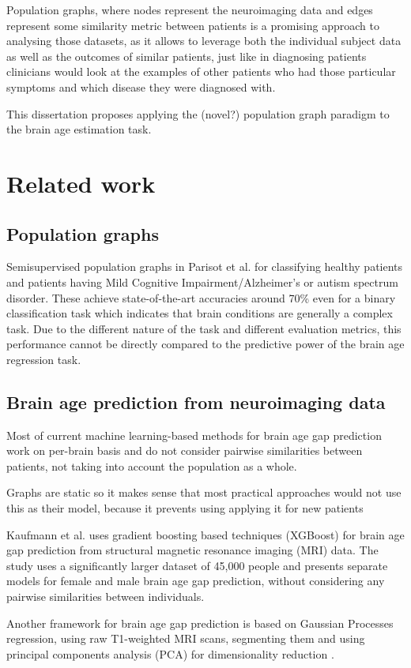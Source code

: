Population graphs, where nodes represent the neuroimaging data and edges represent some similarity metric between patients is a promising approach to analysing those datasets, as it allows to leverage both the individual subject data as well as the outcomes of similar patients, just like in diagnosing patients clinicians would look at the examples of other patients who had those particular symptoms and which disease they were diagnosed with. 

This dissertation proposes applying the (novel?) population graph paradigm to the brain age estimation task.

\section{Related work}
\subsection{Population graphs}
Semisupervised population graphs in Parisot et al. for classifying healthy patients and patients having Mild Cognitive Impairment/Alzheimer's or autism spectrum disorder. These achieve state-of-the-art accuracies around 70\% even for a binary classification task which indicates that brain conditions are generally a complex task. Due to the different nature of the task and different evaluation metrics, this performance cannot be directly compared to the predictive power of the brain age regression task.

\subsection{Brain age prediction from neuroimaging data}
Most of current machine learning-based methods for brain age gap prediction work on per-brain basis and do not consider pairwise similarities between patients, not taking into account the population as a whole.

Graphs are static so it makes sense that most practical approaches would not use this as their model, because it prevents using applying it for new patients

Kaufmann et al. \cite{kaufmann2019} uses gradient boosting based techniques (XGBoost) \cite{chen2016xgboost} for brain age gap prediction from structural magnetic resonance imaging (MRI) data. The study uses a significantly larger dataset of 45,000 people and presents separate models for female and male brain age gap prediction, without considering any pairwise similarities between individuals.

Another framework for brain age gap prediction is based on Gaussian Processes regression, using raw T1-weighted MRI scans, segmenting them and using principal components analysis (PCA) for dimensionality reduction \cite{cole2018brain}.
